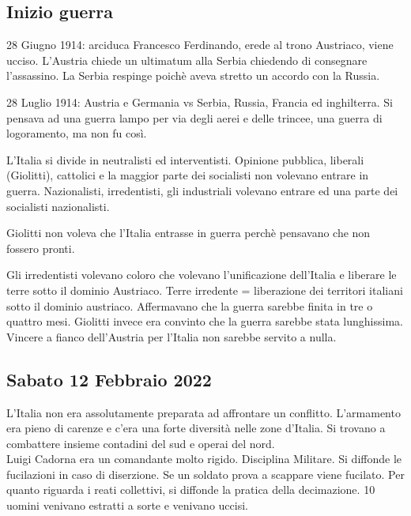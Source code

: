 \documentclass{article}
\begin{document}
    \subsection{Inizio guerra}
    28 Giugno 1914: arciduca Francesco Ferdinando, erede al trono Austriaco, viene ucciso.
    L'Austria chiede un ultimatum alla Serbia chiedendo di consegnare l'assassino. La Serbia respinge poichè aveva stretto
    un accordo con la Russia.

    28 Luglio 1914: Austria e Germania vs Serbia, Russia, Francia ed inghilterra.
    Si pensava ad una guerra lampo per via degli aerei e delle trincee, una guerra di logoramento, ma non fu così.

    L'Italia si divide in neutralisti ed interventisti.
    Opinione pubblica, liberali (Giolitti), cattolici e la maggior parte dei socialisti non volevano entrare in guerra.
    Nazionalisti, irredentisti, gli industriali volevano entrare ed una parte dei socialisti nazionalisti.

    Giolitti non voleva che l'Italia entrasse in guerra perchè pensavano che non fossero pronti.

    Gli irredentisti volevano coloro che volevano l'unificazione dell'Italia e liberare le terre sotto il dominio Austriaco.
    Terre irredente = liberazione dei territori italiani sotto il dominio austriaco.
    Affermavano che la guerra sarebbe finita in tre o quattro mesi.
    Giolitti invece era convinto che la guerra sarebbe stata lunghissima.
    Vincere a fianco dell'Austria per l'Italia non sarebbe servito a nulla.

    \subsection{Sabato 12 Febbraio 2022}
    L'Italia non era assolutamente preparata ad affrontare un conflitto. L'armamento era pieno di carenze e c'era una forte diversità nelle zone d'Italia. Si trovano a combattere insieme contadini del sud e operai del nord.
    \\
    Luigi Cadorna era un comandante molto rigido. Disciplina Militare. Si diffonde le fucilazioni in caso di diserzione. Se un soldato prova a scappare viene fucilato. Per quanto riguarda i reati collettivi, si diffonde la pratica della decimazione. 10 uomini venivano estratti a sorte e venivano uccisi.
\end{document}

